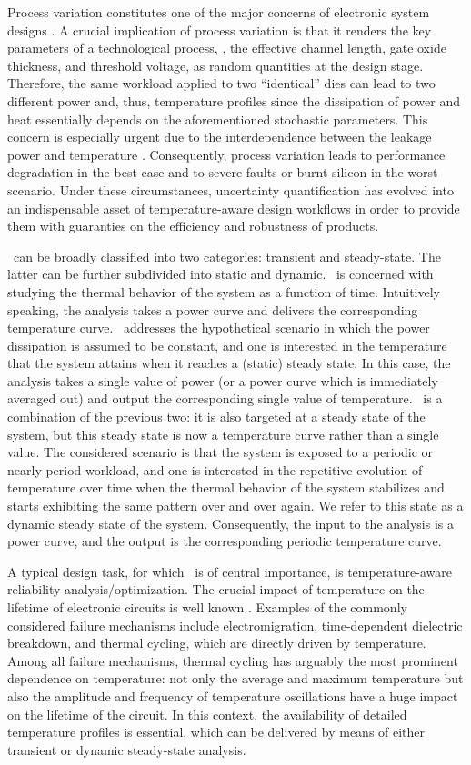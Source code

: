 Process variation constitutes one of the major concerns of electronic system designs \cite{srivastava2010}.
A crucial implication of process variation is that it renders the key parameters of a technological process, \eg, the effective channel length, gate oxide thickness, and threshold voltage, as random quantities at the design stage.
Therefore, the same workload applied to two ``identical'' dies can lead to two different power and, thus, temperature profiles since the dissipation of power and heat essentially depends on the aforementioned stochastic parameters.
This concern is especially urgent due to the interdependence between the leakage power and temperature \cite{liu2007}.
Consequently, process variation leads to performance degradation in the best case and to severe faults or burnt silicon in the worst scenario.
Under these circumstances, uncertainty quantification \cite{maitre2010} has evolved into an indispensable asset of temperature-aware design workflows in order to provide them with guaranties on the efficiency and robustness of products.

\Ta\ can be broadly classified into two categories: transient and steady-state.
The latter can be further subdivided into static and dynamic.
\Tta\ is concerned with studying the thermal behavior of the system as a function of time.
Intuitively speaking, the analysis takes a power curve and delivers the corresponding temperature curve.
\Sssta\ addresses the hypothetical scenario in which the power dissipation is assumed to be constant, and one is interested in the temperature that the system attains when it reaches a (static) steady state.
In this case, the analysis takes a single value of power (or a power curve which is immediately averaged out) and output the corresponding single value of temperature.
\Dssta\ is a combination of the previous two: it is also targeted at a steady state of the system, but this steady state is now a temperature curve rather than a single value.
The considered scenario is that the system is exposed to a periodic or nearly period workload, and one is interested in the repetitive evolution of temperature over time when the thermal behavior of the system stabilizes and starts exhibiting the same pattern over and over again.
We refer to this state as a dynamic steady state of the system.
Consequently, the input to the analysis is a power curve, and the output is the corresponding periodic temperature curve.

A typical design task, for which \ta\ is of central importance, is temperature-aware reliability analysis/optimization.
The crucial impact of temperature on the lifetime of electronic circuits is well known \cite{jedec, das2014}.
Examples of the commonly considered failure mechanisms include electromigration, time-dependent dielectric breakdown, and thermal cycling, which are directly driven by temperature.
Among all failure mechanisms, thermal cycling has arguably the most prominent dependence on temperature: not only the average and maximum temperature but also the amplitude and frequency of temperature oscillations have a huge impact on the lifetime of the circuit.
In this context, the availability of detailed temperature profiles is essential, which can be delivered by means of either transient or dynamic steady-state analysis.

